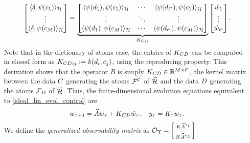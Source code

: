 \begin{align}
 \begin{bmatrix}
  \langle \delta, \psi(c_1) \rangle_{\mathcal{H}}\\
   \vdots\\
  \langle \delta, \psi(c_{M}) \rangle_{\mathcal{H}} 
 \end{bmatrix}
 = 
 \underbrace{
 \begin{bmatrix}
  \langle \psi(d_1),\psi(c_1) \rangle_{\mathcal{H}} & \cdots & \langle \psi(d_{\ell'}),\psi(c_1) \rangle_{\mathcal{H}}\\
   \vdots  &\ddots &\vdots\\
  \langle \psi(d_1),\psi(c_{M}) \rangle_{\mathcal{H}} & \cdots & \langle \psi(d_{\ell'}),\psi(c_{M}) \rangle_{\mathcal{H}}
 \end{bmatrix}}_{K_{CD}}
  \begin{bmatrix}
   \acute{w}_1\\
   \vdots\\
   \acute{w}_{\ell'}
  \end{bmatrix}.
\end{align}
Note that in the dictionary of atoms case, the entries of $K_{CD}$ can be computed in closed form as ${K_{CD}}_{ij}:= k(d_i, c_j)$,
using the reproducing property. 
This derivation shows that the operator $B$ is simply $K_{CD}\in\mathbb{R}^{M\times\ell'}$, the kernel matrix between the data $C$ generating the atoms $\mathcal{F}^{\mathcal{C}}$ of $\widehat{\mathcal{H}}$ and the data $D$ generating the atoms $\mathcal{F}_{D}$ of $\widetilde{\mathcal{H}}$. 
Thus, the finite-dimensional evolution equations equivalent to \eqref{ideal_lin_evol_control} are
\begin{align}
 \weight_{\tindex+1} = \dualopApprox\weight_{\tindex} + \empKCD\weightc_{\tindex}, \quad
 y_{\tindex} = \empK_{\tindex} w_{\tindex} \eqlabel{k_measure_c1}.
\end{align}
We define the \emph{generalized observability matrix} \cite{zhou:bk:96} as 
$  \mathcal{O}_{\Upsilon} = 
 \left[
 \begin{smallmatrix}
  K \widehat{A}^{\tau_1}\\
  \cdots\\
  K \widehat{A}^{\tau_L}
 \end{smallmatrix}
 \right] $
